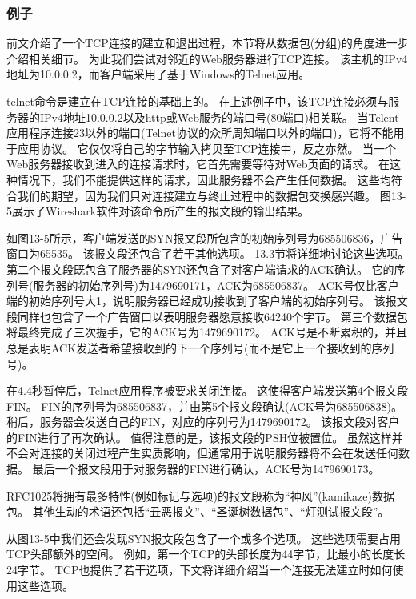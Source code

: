 \documentclass{../main.tex}{subfiles}
\begin{document}
\subsubsection{例子}
前文介绍了一个TCP连接的建立和退出过程，本节将从数据包(分组)的角度进一步介绍相关细节。
为此我们尝试对邻近的Web服务器进行TCP连接。
该主机的IPv4地址为10.0.0.2，而客户端采用了基于Windows的Telnet应用。

telnet命令是建立在TCP连接的基础上的。
在上述例子中，该TCP连接必须与服务器的IPv4地址10.0.0.2以及http或Web服务的端口号(80端口)相关联。
当Telent应用程序连接23以外的端口(Telnet协议的众所周知端口以外的端口)，它将不能用于应用协议。
它仅仅将自己的字节输入拷贝至TCP连接中，反之亦然。
当一个Web服务器接收到进入的连接请求时，它首先需要等待对Web页面的请求。
在这种情况下，我们不能提供这样的请求，因此服务器不会产生任何数据。
这些均符合我们的期望，因为我们只对连接建立与终止过程中的数据包交换感兴趣。
图13-5展示了Wireshark软件对该命令所产生的报文段的输出结果。

如图13-5所示，客户端发送的SYN报文段所包含的初始序列号为685506836，广告窗口为65535。
该报文段还包含了若干其他选项。
13.3节将详细地讨论这些选项。
第二个报文段既包含了服务器的SYN还包含了对客户端请求的ACK确认。
它的序列号(服务器的初始序列号)为1479690171，ACK为685506837。
ACK号仅比客户端的初始序列号大1，说明服务器已经成功接收到了客户端的初始序列号。
该报文段同样也包含了一个广告窗口以表明服务器愿意接收64240个字节。
第三个数据包将最终完成了三次握手，它的ACK号为1479690172。
ACK号是不断累积的，并且总是表明ACK发送者希望接收到的下一个序列号(而不是它上一个接收到的序列号)。

在4.4秒暂停后，Telnet应用程序被要求关闭连接。
这使得客户端发送第4个报文段FIN。
FIN的序列号为685506837，并由第5个报文段确认(ACK号为685506838)。
稍后，服务器会发送自己的FIN，对应的序列号为1479690172。
该报文段对客户的FIN进行了再次确认。
值得注意的是，该报文段的PSH位被置位。
虽然这样并不会对连接的关闭过程产生实质影响，但通常用于说明服务器将不会在发送任何数据。
最后一个报文段用于对服务器的FIN进行确认，ACK号为1479690173。
\begin{tcolorbox}[title={注意}]
    RFC1025将拥有最多特性(例如标记与选项)的报文段称为``神风''(kamikaze)数据包。
    其他生动的术语还包括``丑恶报文''、``圣诞树数据包''、``灯测试报文段''。
\end{tcolorbox}
从图13-5中我们还会发现SYN报文段包含了一个或多个选项。
这些选项需要占用TCP头部额外的空间。
例如，第一个TCP的头部长度为44字节，比最小的长度长24字节。
TCP也提供了若干选项，下文将详细介绍当一个连接无法建立时如何使用这些选项。
\end{document}
